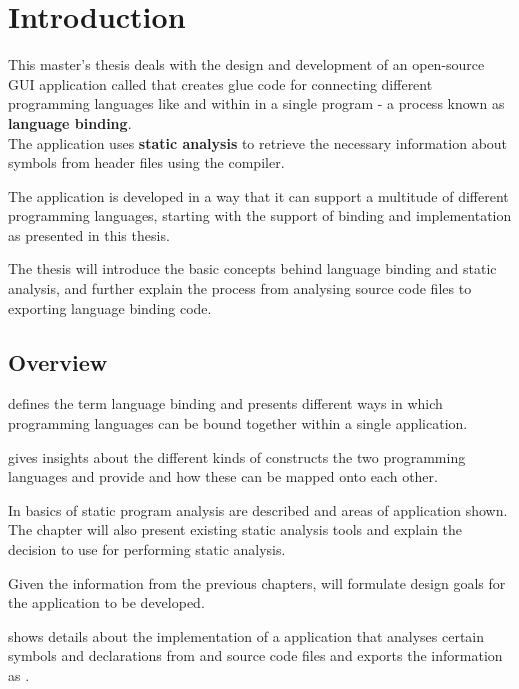 \chapter{Introduction}

This master's thesis deals with the design and development of an open-source GUI application called  that creates glue code for connecting different programming languages like  and  within in a single program - a process known as \textbf{language binding}.\\
The application uses \textbf{static analysis} to retrieve the necessary information about symbols from  header files using the   compiler.

The application is developed in a way that it can support a multitude of different programming languages, starting with the support of binding  and  implementation  as presented in this thesis.

The thesis will introduce the basic concepts behind language binding and static analysis, and further explain the process from analysing source code files to exporting language binding code.

\section{Overview}

 defines the term language binding and presents different ways in which programming languages can be bound together within a single application.

 gives insights about the different kinds of constructs the two programming languages  and  provide and how these can be mapped onto each other.

In  basics of static program analysis are described and areas of application shown. The chapter will also present existing static analysis tools and explain the decision to use  for performing static analysis.

Given the information from the previous chapters,  will formulate design goals for the application to be developed.

 shows details about the implementation of a  application that analyses certain symbols and declarations from  and  source code files and exports the information as .

